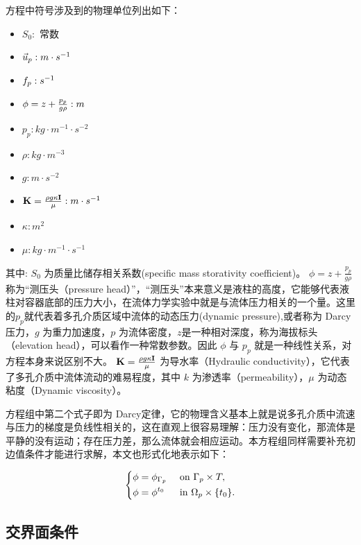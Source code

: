 方程中符号涉及到的物理单位列出如下：
\begin{itemize}
    \item  $S_0 : \text{ 常数 }$
    \item  $\vec{u}_p : m \cdot s^{-1}$
    \item  $f_p : s^{-1}$
    
    
    \item  $\phi = z + \frac{p_p}{g\rho}: m$
    \item  $p_p : kg \cdot m^{-1} \cdot s^{-2}$
    \item  $\rho : kg \cdot m^{-3}$
    \item  $g : m \cdot s^{-2}$
    
    \item  $\mathbf{K} = \frac{\rho g \kappa \mathbf{I} }{\mu} : m \cdot s^{-1}$
    \item  $\kappa : m^2$
    \item  $\mu : kg \cdot m^{-1} \cdot s^{-1}$
\end{itemize}

其中:
$S_0$ 为质量比储存相关系数(specific mass storativity coefficient)。
$\phi = z + \frac{p_p}{g\rho}$ 称为“测压头（pressure head）”，“测压头”本来意义是液柱的高度，它能够代表液柱对容器底部的压力大小，在流体力学实验中就是与流体压力相关的一个量。这里的$p_p$就代表着多孔介质区域中流体的动态压力(dynamic pressure),或者称为 Darcy 压力，$g$ 为重力加速度，$p$ 为流体密度，$z$是一种相对深度，称为海拔标头（elevation head），可以看作一种常数参数。因此 $\phi$ 与 $p_p$ 就是一种线性关系，对方程本身来说区别不大。
$\mathbf{K} = \frac{\rho g \kappa \mathbf{I} }{\mu}$ 为导水率（Hydraulic conductivity），它代表了多孔介质中流体流动的难易程度，其中 $k$ 为渗透率（permeability），$\mu$ 为动态粘度（Dynamic viscosity）。

方程组中第二个式子即为 Darcy定律，它的物理含义基本上就是说多孔介质中流速与压力的梯度是负线性相关的，这在直观上很容易理解：压力没有变化，那流体是平静的没有运动；存在压力差，那么流体就会相应运动。本方程组同样需要补充初边值条件才能进行求解，本文也形式化地表示如下：

\begin{equation}
\left\{
    \begin{aligned}
        \phi &=\phi_{\Gamma_p} & & \text { on } {\Gamma_p} \times T, \\
        \phi &=\phi^{t_0} & & \text { in } {\Omega_p} \times \{t_0\}.
    \end{aligned}
\right.
\end{equation}

\subsection{交界面条件}

